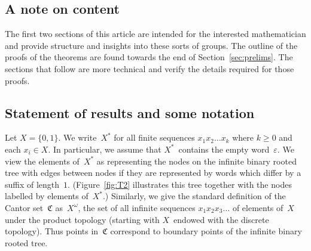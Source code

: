 \documentclass[a4paper,11pt]{article}
\numberwithin{equation}{section}
\newcommand{\C}{\mathfrak{C}}
\renewcommand{\epsilon}{\varepsilon}
\renewcommand{\geq}{\geqslant}
\begin{document}
\subsection{A note on content}

The first two sections of this article are intended for the interested
mathematician and provide structure and insights into these sorts of
groups.  The outline of the proofs of the theorems are found towards
the end of Section~\ref{sec:prelims}.  The sections that follow are
more technical and verify the details required for those proofs.

\subsection{Statement of results and some notation}

Let $X = \{ 0,1 \}$.  We write~$X^{\ast}$ for all finite sequences
$x_{1}x_{2}\dots x_{k}$ where $k \geq 0$ and each $x_{i} \in X$.  In
particular, we assume that $X^{\ast}$~contains the empty
word~$\epsilon$.  We view the elements of~$X^{\ast}$ as representing
the nodes on the infinite binary rooted tree with edges between nodes
if they are represented by words which differ by a suffix of
length~$1$.  (Figure~\ref{fig:T2} illustrates this tree together with
the nodes labelled by elements of~$X^{\ast}$.)  Similarly, we give the
standard definition of the Cantor set~$\C$ as~$X^{\omega}$, the set of
all infinite sequences $x_{1}x_{2}x_{3}\dots$ of elements of~$X$ under
the product topology (starting with $X$~endowed with the discrete
topology).  Thus points in~$\C$ correspond to boundary points of the
infinite binary rooted tree.
\end{document}
